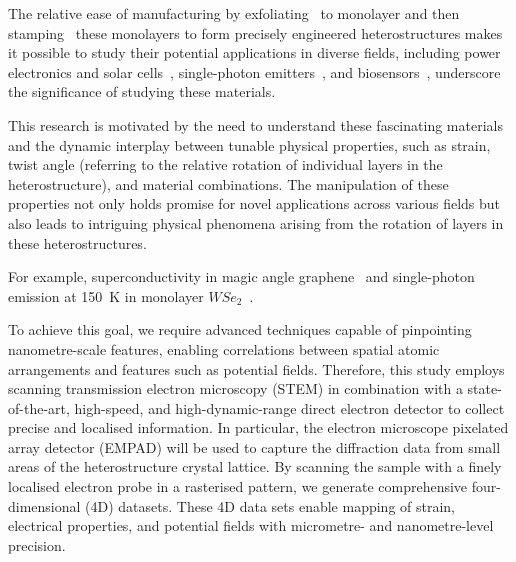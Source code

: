 The relative ease of manufacturing by exfoliating~\cite{bhushan2012encyclopedia,novoselovElectricFieldAtomically2004,kimLargescalePatternGrowth2009,deanBoronNitrideSubstrates2010a} to monolayer and then stamping~\cite{frisendaRecentProgressAssembly2018,castellanos-gomezDeterministicTransferTwodimensional2014} these monolayers to form precisely engineered heterostructures makes it possible to study their potential applications in diverse fields, including power electronics and solar cells~\cite{gongTwoStepGrowthTwoDimensional2015,liEpitaxialGrowthMonolayer2015,duanLateralEpitaxialGrowth2014,gongVerticalInplaneHeterostructures2014,hongUltrafastChargeTransfer2014}, single-photon emitters~\cite{koperskiSinglePhotonEmitters2015, rosenbergerQuantumCalligraphyWriting2019, pengCreationSinglePhotonEmitters2020}, and biosensors~\cite{loanGrapheneMoS2Heterostructures2014}, underscore the significance of studying these materials.

This research is motivated by the need to understand these fascinating materials and the dynamic interplay between tunable physical properties, such as strain, twist angle (referring to the relative rotation of individual layers in the heterostructure), and material combinations. The manipulation of these properties not only holds promise for novel applications across various fields but also leads to intriguing physical phenomena arising from the rotation of layers in these heterostructures.

For example, superconductivity in magic angle graphene~\cite{caoUnconventionalSuperconductivityMagicangle2018} and single-photon emission at \SI{150}{\kelvin} in monolayer $WSe_2$~\cite{partoDefectStrainEngineering2021}.

To achieve this goal, we require advanced techniques capable of pinpointing nanometre-scale features, enabling correlations between spatial atomic arrangements and features such as potential fields. Therefore, this study employs scanning transmission electron microscopy (STEM) in combination with a state-of-the-art, high-speed, and high-dynamic-range direct electron detector to collect precise and localised information. In particular, the electron microscope pixelated array detector (EMPAD) will be used to capture the diffraction data from small areas of the heterostructure crystal lattice. By scanning the sample with a finely localised electron probe in a rasterised pattern, we generate comprehensive four-dimensional (4D) datasets. These 4D data sets enable mapping of strain, electrical properties, and potential fields with micrometre- and nanometre-level precision.

